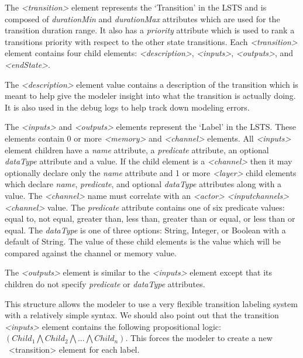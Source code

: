 The {\em \textless transition\textgreater} element represents the `Transition' in the LSTS and is composed of {\em durationMin} and {\em durationMax} attributes which are used for the transition duration range.  It also has a {\em priority} attribute which is used to rank a transitions priority with respect to the other state transitions.  Each {\em \textless transition\textgreater} element contains four child elements: {\em \textless description\textgreater}, {\em \textless inputs\textgreater}, {\em \textless outputs\textgreater}, and {\em \textless endState\textgreater}.  

The {\em \textless description\textgreater} element value contains a description of the transition which is meant to help give the modeler insight into what the transition is actually doing.  It is also used in the debug logs to help track down modeling errors.  

The {\em \textless inputs\textgreater} and {\em \textless outputs\textgreater} elements represent the `Label' in the LSTS.  These elements contain 0 or more {\em \textless memory\textgreater} and {\em \textless channel\textgreater} elements.  All {\em \textless inputs\textgreater} element children have a {\em name} attribute, a {\em predicate} attribute, an optional {\em dataType} attribute and a value.  If the child element is a {\em \textless channel\textgreater} then it may optionally declare only the {\em name} attribute and 1 or more {\em \textless layer\textgreater} child elements which declare {\em name}, {\em predicate}, and optional {\em dataType} attributes along with a value.  The {\em \textless channel\textgreater} name must correlate with an {\em \textless actor\textgreater} {\em \textless inputchannels\textgreater} {\em \textless channel\textgreater} value.  The {\em predicate} attribute contains one of six predicate values: equal to, not equal, greater than, less than, greater than or equal, or less than or equal.  The {\em dataType} is one of three options: String, Integer, or Boolean with a default of String.  The value of these child elements is the value which will be compared against the channel or memory value.  

The {\em \textless outputs\textgreater} element is similar to the {\em \textless inputs\textgreater} element except that its children do not specify {\em predicate} or {\em dataType} attributes.  

This structure allows the modeler to use a very flexible transition labeling system with a relatively simple syntax.  We should also point out that the transition {\em \textless inputs\textgreater} element contains the following propositional logic: $(Child_{1} \bigwedge Child_{2} \bigwedge \ldots \bigwedge Child_{n})$.  This forces the modeler to create a new {\ <transition\textgreater} element for each label.

